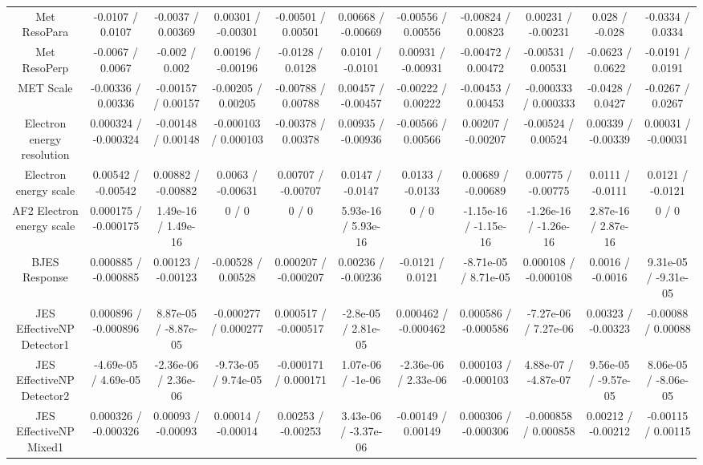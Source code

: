 \begin{table}[htbp]
\begin{center}
\begin{tabular}{|c|c|c|c|c|c|c|c|c|c|c|}
  Met ResoPara & -0.0107 / 0.0107 & -0.0037 / 0.00369 & 0.00301 / -0.00301 & -0.00501 / 0.00501 & 0.00668 / -0.00669 & -0.00556 / 0.00556 & -0.00824 / 0.00823 & 0.00231 / -0.00231 & 0.028 / -0.028 & -0.0334 / 0.0334 \\ 
  Met ResoPerp & -0.0067 / 0.0067 & -0.002 / 0.002 & 0.00196 / -0.00196 & -0.0128 / 0.0128 & 0.0101 / -0.0101 & 0.00931 / -0.00931 & -0.00472 / 0.00472 & -0.00531 / 0.00531 & -0.0623 / 0.0622 & -0.0191 / 0.0191 \\ 
  MET Scale & -0.00336 / 0.00336 & -0.00157 / 0.00157 & -0.00205 / 0.00205 & -0.00788 / 0.00788 & 0.00457 / -0.00457 & -0.00222 / 0.00222 & -0.00453 / 0.00453 & -0.000333 / 0.000333 & -0.0428 / 0.0427 & -0.0267 / 0.0267 \\ 
  Electron energy resolution & 0.000324 / -0.000324 & -0.00148 / 0.00148 & -0.000103 / 0.000103 & -0.00378 / 0.00378 & 0.00935 / -0.00936 & -0.00566 / 0.00566 & 0.00207 / -0.00207 & -0.00524 / 0.00524 & 0.00339 / -0.00339 & 0.00031 / -0.00031 \\ 
  Electron energy scale & 0.00542 / -0.00542 & 0.00882 / -0.00882 & 0.0063 / -0.00631 & 0.00707 / -0.00707 & 0.0147 / -0.0147 & 0.0133 / -0.0133 & 0.00689 / -0.00689 & 0.00775 / -0.00775 & 0.0111 / -0.0111 & 0.0121 / -0.0121 \\ 
  AF2 Electron energy scale & 0.000175 / -0.000175 & 1.49e-16 / 1.49e-16 & 0 / 0 & 0 / 0 & 5.93e-16 / 5.93e-16 & 0 / 0 & -1.15e-16 / -1.15e-16 & -1.26e-16 / -1.26e-16 & 2.87e-16 / 2.87e-16 & 0 / 0 \\ 
  BJES Response & 0.000885 / -0.000885 & 0.00123 / -0.00123 & -0.00528 / 0.00528 & 0.000207 / -0.000207 & 0.00236 / -0.00236 & -0.0121 / 0.0121 & -8.71e-05 / 8.71e-05 & 0.000108 / -0.000108 & 0.0016 / -0.0016 & 9.31e-05 / -9.31e-05 \\ 
  JES EffectiveNP Detector1 & 0.000896 / -0.000896 & 8.87e-05 / -8.87e-05 & -0.000277 / 0.000277 & 0.000517 / -0.000517 & -2.8e-05 / 2.81e-05 & 0.000462 / -0.000462 & 0.000586 / -0.000586 & -7.27e-06 / 7.27e-06 & 0.00323 / -0.00323 & -0.00088 / 0.00088 \\ 
  JES EffectiveNP Detector2 & -4.69e-05 / 4.69e-05 & -2.36e-06 / 2.36e-06 & -9.73e-05 / 9.74e-05 & -0.000171 / 0.000171 & 1.07e-06 / -1e-06 & -2.36e-06 / 2.33e-06 & 0.000103 / -0.000103 & 4.88e-07 / -4.87e-07 & 9.56e-05 / -9.57e-05 & 8.06e-05 / -8.06e-05 \\ 
  JES EffectiveNP Mixed1 & 0.000326 / -0.000326 & 0.00093 / -0.00093 & 0.00014 / -0.00014 & 0.00253 / -0.00253 & 3.43e-06 / -3.37e-06 & -0.00149 / 0.00149 & 0.000306 / -0.000306 & -0.000858 / 0.000858 & 0.00212 / -0.00212 & -0.00115 / 0.00115 \\ 

\end{tabular}
\end{center}
\end{table}
